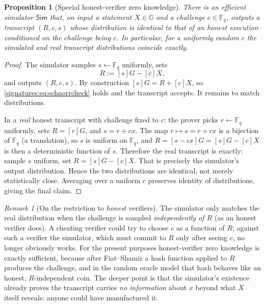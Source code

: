 \documentclass[11pt,a4paper]{article}
\newtheorem{proposition}[theorem]{Proposition}
\theoremstyle{definition}
\theoremstyle{remark}
\newtheorem{remark}[theorem]{Remark}
\newcommand{\G}{\ensuremath{\mathbb{G}}}
\newcommand{\Fq}{\ensuremath{\mathbb{F}_{q}}}
\begin{document}
\begin{proposition}[Special honest-verifier zero knowledge]\label{signatures:prop:hvzk}
There is an efficient simulator \(\mathsf{Sim}\) that, on input a statement \(X \in \G\) and a challenge \(c \in \Fq\), outputs a transcript \((R, c, s)\) whose distribution is identical to that of an honest execution conditioned on the challenge being \(c\). In particular, for a uniformly random \(c\) the simulated and real transcript distributions coincide exactly.
\end{proposition}

\begin{proof}
The simulator samples \(s \gets \Fq\) uniformly, sets
\[
  R := [s]G - [c]X,
\]
and outputs \((R, c, s)\). By construction \([s]G = R + [c]X\), so \eqref{signatures:eq:schnorrcheck} holds and the transcript accepts. It remains to match distributions.

In a \emph{real} honest transcript with challenge fixed to \(c\): the prover picks \(r \gets \Fq\) uniformly, sets \(R = [r]G\), and \(s = r + cx\). The map \(r \mapsto s = r + cx\) is a bijection of \(\Fq\) (a translation), so \(s\) is uniform on \(\Fq\), and \(R = [s - cx]G = [s]G - [c]X\) is then a deterministic function of \(s\). Therefore the real transcript is exactly: sample \(s\) uniform, set \(R = [s]G - [c]X\). That is precisely the simulator's output distribution. Hence the two distributions are identical, not merely statistically close. Averaging over a uniform \(c\) preserves identity of distributions, giving the final claim.
\end{proof}

\begin{remark}[On the restriction to \emph{honest} verifiers]\label{signatures:rem:hvzk}
The simulator only matches the real distribution when the challenge is sampled \emph{independently of \(R\)} (as an honest verifier does). A cheating verifier could try to choose \(c\) as a function of \(R\); against such a verifier the simulator, which must commit to \(R\) only after seeing \(c\), no longer obviously works. For the present purposes honest-verifier zero knowledge is exactly sufficient, because after Fiat--Shamir a hash function applied to \(R\) produces the challenge, and in the random oracle model that hash behaves like an honest, \(R\)-independent coin. The deeper point is that the simulator's existence already proves the transcript carries \emph{no information} about \(x\) beyond what \(X\) itself reveals: anyone could have manufactured it.
\end{remark}
\end{document}
